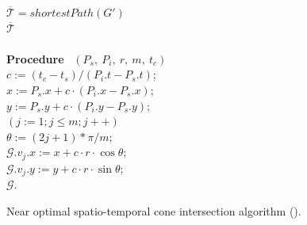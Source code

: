 \begin{figure}[tb!]
\begin{center}
{\begin{minipage}{3.36in}
{					\icc \hspace{0ex} $\overline{\mathcal{T}} = {shortestPath}(G')$\\
					\icc \hspace{0ex} \Return $\overline{\mathcal{T}}$
					\\
					\\
					{\bf Procedure} ~$(P_s,~P_i,~r,~m,~t_c)$ \\
					\bcc \hspace{1ex} $c := (t_c-t_s)/(P_i.t - P_s.t)$; \\
					\icc \hspace{1ex} $x := P_s.x + c\cdot(P_i.x-P_s.x)$; \\
					\icc \hspace{1ex} $y := P_s.y + c\cdot(P_i.y-P_s.y)$; \\
					\icc \hspace{1ex} \For $(j := 1;j \le m;j++)$ \Do \\
					\icc \> \hspace{2ex} $\theta :=  (2j + 1)*\pi /m $; \\
					\icc \> \hspace{2ex} $\mathcal{G}.v_j.x := x + c\cdot r\cdot\cos\theta$;\\
					\icc \> \hspace{2ex} $\mathcal{G}.v_j.y := y + c\cdot r\cdot\sin\theta$;\\
					\icc \hspace{1ex} \Return $\mathcal{G}$.

				}
				\vspace{-2ex}
				\myhrule
			\end{minipage}
		}
	\end{center}
	\vspace{-2ex}
	\caption{\small Near optimal spatio-temporal cone intersection algorithm (\cisto).}
	\label{alg:cisedo}
	\vspace{-2ex}
\end{figure}

